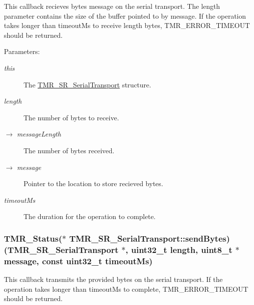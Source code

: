 This callback recieves bytes message on the serial transport. The length parameter contains the size of the buffer pointed to by message. If the operation takes longer than timeoutMs to receive length bytes, TMR\_\-ERROR\_\-TIMEOUT should be returned.

\begin{Desc}
\item[Parameters:]
\begin{description}
\item[{\em this}]The \hyperlink{struct_t_m_r___s_r___serial_transport}{TMR\_\-SR\_\-SerialTransport} structure. \item[{\em length}]The number of bytes to receive. \item[\mbox{$\rightarrow$} {\em messageLength}]The number of bytes received. \item[\mbox{$\rightarrow$} {\em message}]Pointer to the location to store recieved bytes. \item[{\em timeoutMs}]The duration for the operation to complete. \end{description}
\end{Desc}
\hypertarget{struct_t_m_r___s_r___serial_transport_ae7f9dd7899fc5ca98baccac4dbc2215}{
\subsubsection[{sendBytes}]{\setlength{\rightskip}{0pt plus 5cm}TMR\_\-Status($\ast$ {\bf TMR\_\-SR\_\-SerialTransport::sendBytes})({\bf TMR\_\-SR\_\-SerialTransport} $\ast$, uint32\_\-t length, uint8\_\-t $\ast$message, const uint32\_\-t timeoutMs)}}
\label{struct_t_m_r___s_r___serial_transport_ae7f9dd7899fc5ca98baccac4dbc2215}


This callback transmits the provided bytes on the serial transport. If the operation takes longer than timeoutMs to complete, TMR\_\-ERROR\_\-TIMEOUT should be returned.

